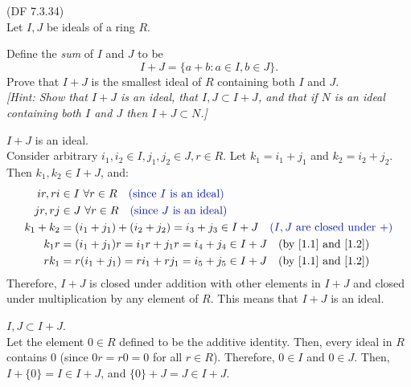\begin{problem}{(\textsf{DF 7.3.34})} \\
  Let $I,J$ be ideals of a ring $R$.
  \begin{enumalph}
    \item Define the \emph{sum} of $I$ and $J$ to be
      \[ I+J=\{a+b:a \in I, b \in J\}. \]
      Prove that $I+J$ is the smallest ideal of $R$ containing both $I$ and $J$. \\
      \emph{[Hint: Show that $I+J$ is an ideal, that $I,J \subset I+J$,
        and that if $N$ is an ideal containing both $I$ and $J$ then $I+J \subset N$.]}
        \begin{Answer}
          \begin{enumroman}
            \item $I+J$ is an ideal. \\
              Consider arbitrary $i_1, i_2 \in I, j_1, j_2 \in J, r \in R$.
              Let $k_1 = i_1 + j_1$ and $k_2 = i_2 + j_2$. Then $k_1, k_2 \in I+J$, and:
              \begin{align}
                ir, ri &\in I\ \forall r \in R \quad \zaff{\text{(since $I$ is an ideal)}}~\label{1.1} \\
                jr, rj &\in J\ \forall r \in R \quad \zaff{\text{(since $J$ is an ideal)}}~\label{1.2} \\
                k_1 + k_2 &= (i_1 + j_1) + (i_2 + j_2) = i_3 + j_3 \in I + J \quad
                \zaff{\text{($I, J$ are closed under $+$)}}\\
                k_1 r &= (i_1 + j_1) r = i_1 r + j_1 r  = i_4 + j_4 \in I + J \quad
                \text{(by \ref{1.1} and \ref{1.2})} \\
                r k_1 &= r (i_1 + j_1) = r i_1 + r j_1 = i_5 + j_5 \in I + J \quad
                \text{(by \ref{1.1} and \ref{1.2})}
              \end{align}
              Therefore, $I+J$ is closed under addition with other elements in $I+J$
              and closed under multiplication by any element of $R$.
              This means that $I+J$ is an ideal.
            \item $I, J \subset I + J$. \\
              Let the element $0 \in R$ defined to be the additive identity.
              Then, every ideal in $R$ contains $0$
              (since $0r = r0 = 0$ for all $r \in R$). Therefore, $0 \in I$ and $0 \in J$.
              Then, $I + \{ 0 \} = I \in I + J$, and $\{ 0 \} + J = J \in I + J$.

\end{enumroman}
\end{Answer}
\end{enumalph}
\end{problem}
